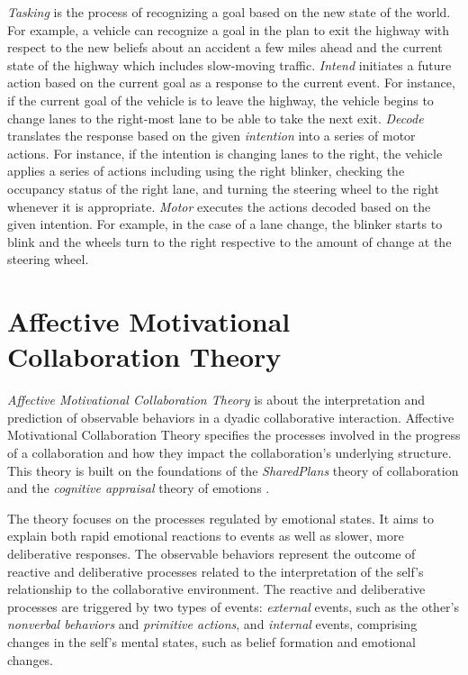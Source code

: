 \documentclass[journal, 11pt]{IEEEtran}
\begin{document}
\textit{Tasking} is the process of recognizing a goal based on the new state of
the world. For example, a vehicle can recognize a goal in the plan to exit the
highway with respect to the new beliefs about an accident a few miles ahead and
the current state of the highway which includes slow-moving traffic.
\textit{Intend} initiates a future action based on the current goal as a
response to the current event. For instance, if the current goal of the vehicle
is to leave the highway, the vehicle begins to change lanes to the right-most
lane to be able to take the next exit. \textit{Decode} translates the response
based on the given \textit{intention} into a series of motor actions. For
instance, if the intention is changing lanes to the right, the vehicle applies a
series of actions including using the right blinker, checking the occupancy
status of the right lane, and turning the steering wheel to the right whenever
it is appropriate. \textit{Motor} executes the actions decoded based on the
given intention. For example, in the case of a lane change, the blinker starts
to blink and the wheels turn to the right respective to the amount of change at
the steering wheel.

\section{{\fontsize{11.5}{9}\selectfont Affective Motivational Collaboration
Theory}}
\label{sec:amct}

\textit{Affective Motivational Collaboration Theory}
\cite{shayganfar:theory-overview} is about the interpretation and prediction of
observable behaviors in a dyadic collaborative interaction. Affective
Motivational Collaboration Theory specifies the processes involved in the
progress of a collaboration and how they impact the collaboration's underlying
structure. This theory is built on the foundations of the \textit{SharedPlans}
theory of collaboration \cite{grosz:plans-discourse} and the \textit{cognitive
appraisal} theory of emotions \cite{gratch:domain-independent}.

The theory focuses on the processes regulated by emotional states. It aims to
explain both rapid emotional reactions to events as well as slower, more
deliberative responses. The observable behaviors represent the outcome of
reactive and deliberative processes related to the interpretation of the self's
relationship to the collaborative environment. The reactive and deliberative
processes are triggered by two types of events: \textit{external} events, such
as the other's \textit{nonverbal behaviors} and \textit{primitive actions}, and
\textit{internal} events, comprising changes in the self's mental states, such
as belief formation and emotional changes.
\end{document}
